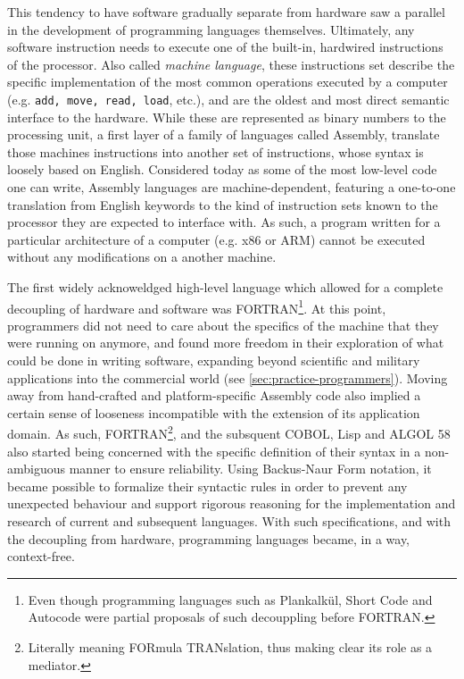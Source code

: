 This tendency to have software gradually separate from hardware saw a parallel in the development of programming languages themselves. Ultimately, any software instruction needs to execute one of the built-in, hardwired instructions of the processor. Also called \emph{machine language}, these instructions set describe the specific implementation of the most common operations executed by a computer (e.g. \lstinline{add, move, read, load}, etc.), and are the oldest and most direct semantic interface to the hardware. While these are represented as binary numbers to the processing unit, a first layer of a family of languages called Assembly, translate those machines instructions into another set of instructions, whose syntax is loosely based on English. Considered today as some of the most low-level code one can write, Assembly languages are machine-dependent, featuring a one-to-one translation from English keywords to the kind of instruction sets known to the processor they are expected to interface with. As such, a program written for a particular architecture of a computer (e.g. x86 or ARM) cannot be executed without any modifications on a another machine.


The first widely acknoweldged high-level language which allowed for a complete decoupling of hardware and software was FORTRAN\footnote{Even though programming languages such as Plankalkül, Short Code and Autocode were partial proposals of such decouppling before FORTRAN.}. At this point, programmers did not need to care about the specifics of the machine that they were running on anymore, and found more freedom in their exploration of what could be done in writing software, expanding beyond scientific and military applications into the commercial world (see \ref{sec:practice-programmers}). Moving away from hand-crafted and platform-specific Assembly code also implied a certain sense of looseness incompatible with the extension of its application domain. As such, FORTRAN\footnote{Literally meaning FORmula TRANslation, thus making clear its role as a mediator.}, and the subsquent COBOL, Lisp and ALGOL 58 also started being concerned with the specific definition of their syntax in a non-ambiguous manner to ensure reliability. Using Backus-Naur Form notation, it became possible to formalize their syntactic rules in order to prevent any unexpected behaviour and support rigorous reasoning for the implementation and research of current and subsequent languages. With such specifications, and with the decoupling from hardware, programming languages became, in a way, context-free.

